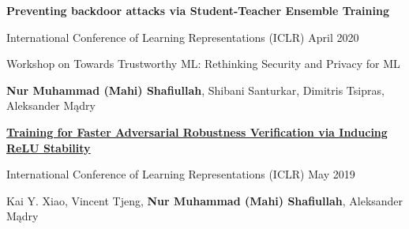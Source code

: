\EntryGap
{\textbf{Preventing backdoor attacks via Student-Teacher Ensemble Training}}
\par 
{International Conference of Learning Representations (ICLR)}
\hfill{April 2020}
\par 
{Workshop on Towards Trustworthy ML: Rethinking Security and Privacy for ML}
\par 
{\textbf{Nur Muhammad (Mahi) Shafiullah}, Shibani Santurkar, Dimitris Tsipras, Aleksander M\k{a}dry}

\EntryGap
\href{https://arxiv.org/pdf/1809.03008.pdf}
{\textbf{Training for Faster Adversarial Robustness Verification via Inducing ReLU Stability}}
\par 
{International Conference of Learning Representations (ICLR)} \hfill{  May 2019}
\par 
{Kai Y. Xiao, Vincent Tjeng, \textbf{Nur Muhammad (Mahi) Shafiullah}, Aleksander M\k{a}dry}